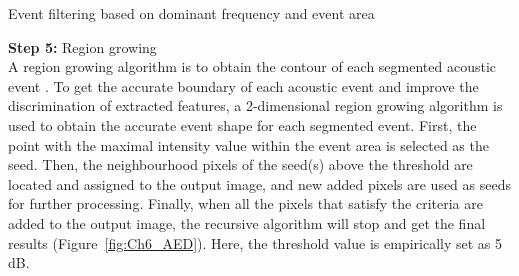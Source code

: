 \begin{algorithm}
\DontPrintSemicolon
{}

\caption{Event filtering based on dominant frequency and event area}
\end{algorithm}

\noindent \textbf{Step 5:} Region growing
\\
A region growing algorithm is to obtain the contour of each segmented acoustic event \citep{mallawaarachchi2008spectrogram}. To get the accurate boundary of each acoustic event and improve the discrimination of extracted features, a 2-dimensional region growing algorithm is used to obtain the accurate event shape for each segmented event. First, the point with the maximal intensity value within the event area is selected as the seed. Then, the neighbourhood pixels of the seed(s) above the threshold are located and assigned to the output image, and new added pixels are used as seeds for further processing. Finally, when all the pixels that satisfy the criteria are added to the output image, the recursive algorithm will stop and get the final results (Figure~\ref{fig:Ch6_AED}). Here, the threshold value is empirically set as 5 dB.

